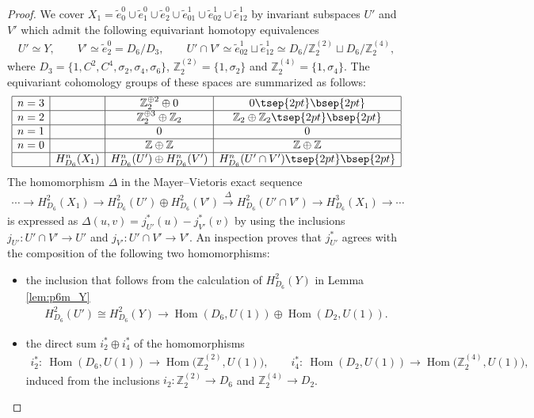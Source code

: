 \documentclass[pdftex]{sigma}
\theoremstyle{definition}
\newcommand{\Z}{\mathbb{Z}}
\begin{document}
\begin{proof}
We cover $X_1 = \tilde{e}^0_0 \cup \tilde{e}^0_1 \cup \tilde{e}^0_2 \cup \tilde{e}^1_{01} \cup \tilde{e}^1_{02} \cup \tilde{e}^1_{12}$ by invariant subspaces $U'$ and $V'$ which admit the following equivariant homotopy equivalences
\begin{gather*}
U' \simeq Y, \qquad
V' \simeq \tilde{e}^0_2 = D_6/D_3, \qquad
U' \cap V' \simeq \tilde{e}^1_{02} \sqcup \tilde{e}^1_{12} \simeq D_6/\Z_2^{(2)} \sqcup D_6/\Z_2^{(4)},
\end{gather*}
where $D_3 = \{ 1, C^2, C^4, \sigma_2, \sigma_4, \sigma_6 \}$, $\Z_2^{(2)} = \{ 1, \sigma_2 \}$ and $\Z_2^{(4)} = \{ 1, \sigma_4 \}$. The equivariant cohomology groups of these spaces are summarized as follows:
$$
\begin{array}{|c|c|c|c|}
\hline
n = 3 & & \Z_2^{\oplus 2} \oplus 0 & 0\tsep{2pt}\bsep{2pt} \\
\hline
n = 2 & & \Z_2^{\oplus 3} \oplus \Z_2 & \Z_2 \oplus \Z_2 \tsep{2pt}\bsep{2pt}\\
\hline
n = 1 & & 0 & 0 \\
\hline
n = 0 & & \Z \oplus \Z & \Z \oplus \Z \\
\hline
& H^n_{D_6}(X_1) & H^n_{D_6}(U') \oplus H^n_{D_6}(V') & H^n_{D_6}(U' \cap V') \tsep{2pt}\bsep{2pt}\\
\hline
\end{array}
$$
The homomorphism $\Delta$ in the Mayer--Vietoris exact sequence
\begin{gather*}
\cdots \to H^2_{D_6}(X_1) \to H^2_{D_6}(U') \oplus H^2_{D_6}(V') \overset{\Delta}{\to} H^2_{D_6}(U' \cap V') \to H^3_{D_6}(X_1) \to \cdots
\end{gather*}
is expressed as $\Delta(u, v) = j_{U'}^*(u) - j_{V'}^*(v)$ by using the inclusions $j_{U'} \colon U' \cap V' \to U'$ and $j_{V'} \colon U' \cap V' \to V'$. An inspection proves that $j_{U'}^*$ agrees with the composition of the following two homomorphisms:
\begin{itemize}\itemsep=0pt
\item[(i)]
the inclusion that follows from the calculation of $H^2_{D_6}(Y)$ in Lemma \ref{lem:p6m_Y}
\begin{gather*}
H^2_{D_6}(U') \cong H^2_{D_6}(Y) \longrightarrow
\operatorname{Hom}(D_6, U(1)) \oplus \operatorname{Hom}(D_2, U(1)).
\end{gather*}

\item[(ii)]
the direct sum $i_2^* \oplus i_4^*$ of the homomorphisms
\begin{gather*}
i^*_2 \colon \ \operatorname{Hom}(D_6, U(1)) \to \operatorname{Hom}\big(\Z_2^{(2)}, U(1)\big), \qquad
i^*_4 \colon \ \operatorname{Hom}(D_2, U(1)) \to \operatorname{Hom}\big(\Z_2^{(4)}, U(1)\big),
\end{gather*}
induced from the inclusions $i_2\colon \Z_2^{(2)} \to D_6$ and $\Z_2^{(4)} \to D_2$.


\end{itemize}
\end{proof}
\end{document}

